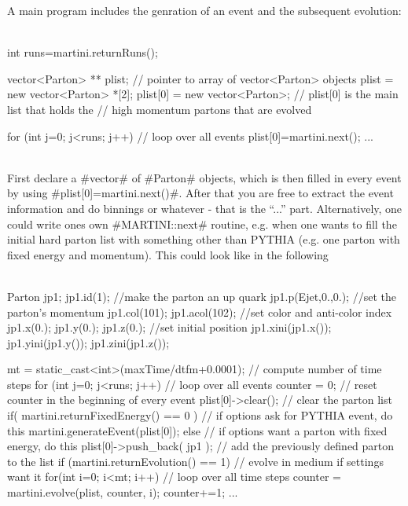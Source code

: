 A main program includes the genration of an event and the subsequent evolution:\\
~\\
\begin{boxedverbatim}
  int runs=martini.returnRuns();

  vector<Parton> ** plist;          // pointer to array of vector<Parton> objects
  plist = new vector<Parton> *[2];  
  plist[0] = new vector<Parton>;    // plist[0] is the main list that holds the 
                                    // high momentum partons that are evolved

  for (int j=0; j<runs; j++)        // loop over all events
    {
      plist[0]=martini.next();
      ... 
    }
\end{boxedverbatim} 

~\\
First declare a #vector# of #Parton# objects, which is then filled in every event by using #plist[0]=martini.next()#.
After that you are free to extract the event information and do binnings or whatever - that is the ``...'' part.
Alternatively, one could write ones own #MARTINI::next# routine, e.g. when one wants to fill the initial hard parton list
with something other than PYTHIA (e.g. one parton with fixed energy and momentum). This could look like in the following\\
~\\
\begin{boxedverbatim}
   Parton jp1; 
   jp1.id(1); //make the parton an up quark
   jp1.p(Ejet,0.,0.); //set the parton's momentum
   jp1.col(101); jp1.acol(102); //set color and anti-color index
   jp1.x(0.); jp1.y(0.); jp1.z(0.); //set initial position
   jp1.xini(jp1.x()); jp1.yini(jp1.y()); jp1.zini(jp1.z());
 
   mt = static_cast<int>(maxTime/dtfm+0.0001); // compute number of time steps
   for (int j=0; j<runs; j++)     // loop over all events
    {
      counter = 0;                // reset counter in the beginning of every event
      plist[0]->clear();          // clear the parton list
      if( martini.returnFixedEnergy() == 0 ) // if options ask for PYTHIA event, do this
        {
          martini.generateEvent(plist[0]); 
        }
       else                       // if options want a parton with fixed energy, do this
        {
          plist[0]->push_back( jp1 ); // add the previously defined parton to the list     
        }
      if (martini.returnEvolution() == 1)    // evolve in medium if settings want it
        {
          for(int i=0; i<mt; i++) // loop over all time steps 
            {
              counter = martini.evolve(plist, counter, i);
              counter+=1;
            }
        }
     ...
    }
\end{boxedverbatim}

